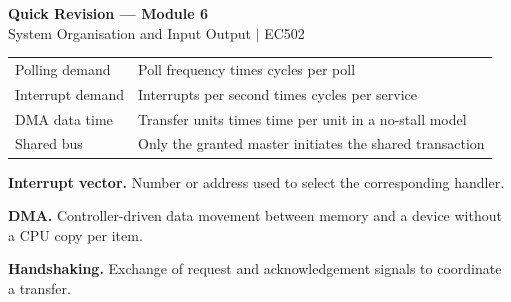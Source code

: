 \documentclass[12pt,a4paper]{article}
\renewcommand{\arraystretch}{1.45}
\begin{document}
\newpage
\begin{center}
  {\large\bfseries\color{myred} Quick Revision --- Module 6}\\[3pt]
  {\small\color{mydark} System Organisation and Input Output $|$ EC502}
\end{center}
\noindent{\color{myred}\rule{\linewidth}{1.2pt}}
\begin{tcolorbox}[formulabox,title={Key Formulas at a Glance}]
\renewcommand{\arraystretch}{1.35}
\begin{tabularx}{\linewidth}{B{5.0cm}Y}
Polling demand & Poll frequency times cycles per poll \\[3pt]
Interrupt demand & Interrupts per second times cycles per service \\[3pt]
DMA data time & Transfer units times time per unit in a no-stall model \\[3pt]
Shared bus & Only the granted master initiates the shared transaction \\[3pt]
\end{tabularx}
\end{tcolorbox}
\begin{tcolorbox}[defbox,title={One-Line Definitions}]
\textbf{Interrupt vector.} Number or address used to select the corresponding handler.\par
\textbf{DMA.} Controller-driven data movement between memory and a device without a CPU copy per item.\par
\textbf{Handshaking.} Exchange of request and acknowledgement signals to coordinate a transfer.\par
\end{tcolorbox}
\end{document}

